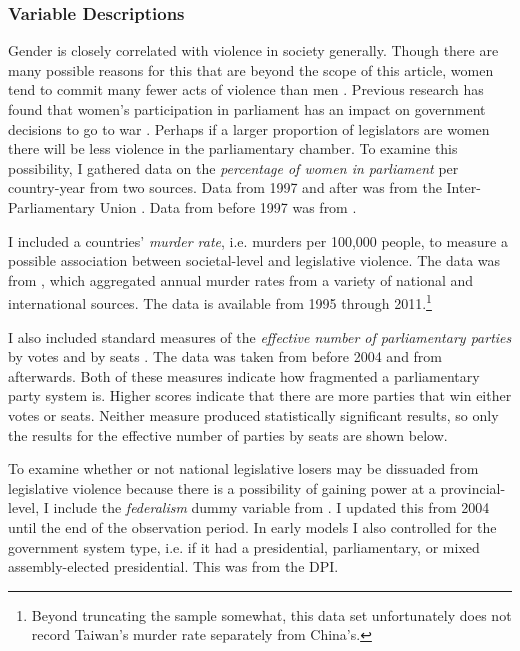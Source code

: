\documentclass[a4paper]{article}\usepackage[]{graphicx}\usepackage[]{color}
\begin{document}
\subsubsection*{Variable Descriptions}

Gender is closely correlated with violence in society generally. Though there are many possible reasons for this that are beyond the scope of this article, women tend to commit many fewer acts of violence than men \citep[]{Schwartz2009}. Previous research has found that women's participation in parliament has an impact on government decisions to go to war \citep{Melander2005}. Perhaps if a larger proportion of legislators are women there will be less violence in the parliamentary chamber. To examine this possibility, I gathered data on the \emph{percentage of women in parliament} per country-year from two sources. Data from 1997 and after was from the Inter-Parliamentary Union \citeyearpar{IPU2013}. Data from before 1997 was from \cite{Schwartz2009}.

I included a countries' \emph{murder rate}, i.e. murders per 100,000 people, to measure a possible association between societal-level and legislative violence. The data was from \cite{UNMurder2013}, which aggregated annual murder rates from a variety of national and international sources. The data is available from 1995 through 2011.\footnote{Beyond truncating the sample somewhat, this data set unfortunately does not record Taiwan's murder rate separately from China's.}

I also included standard measures of the \emph{effective number of parliamentary parties} by votes and by seats \citep[]{Laakso1979, Taagepera1989}. The data was taken from \cite{Carey2011} before 2004 and from \cite{Gallagher2012} afterwards. Both of these measures indicate how fragmented a parliamentary party system is. Higher scores indicate that there are more parties that win either votes or seats. Neither measure produced statistically significant results, so only the results for the effective number of parties by seats are shown below.

To examine whether or not national legislative losers may be dissuaded from legislative violence because there is a possibility of gaining power at a provincial-level, I include the \emph{federalism} dummy variable from \cite{Carey2011}. I updated this from 2004 until the end of the observation period. In early models I also controlled for the government system type, i.e. if it had a presidential, parliamentary, or mixed assembly-elected presidential. This was from the DPI.
\end{document}
